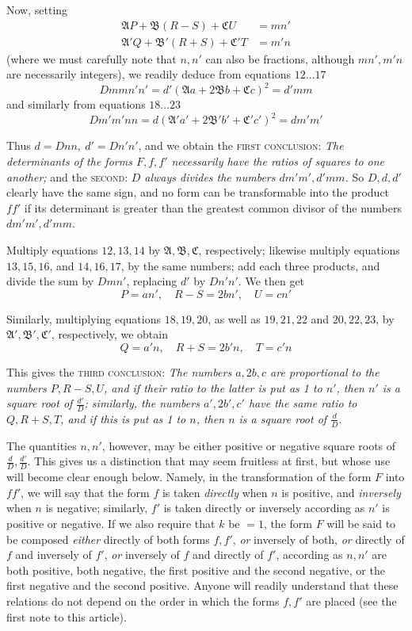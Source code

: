 Now, setting
\[
\begin{aligned}
\mathfrak{A}P+\mathfrak{B}(R-S)+\mathfrak{C}U&=mn'\\
\mathfrak{A}'Q+\mathfrak{B}'(R+S)+\mathfrak{C}'T&=m'n
\end{aligned}
\]
(where we must carefully note that $n,n'$ can also be fractions, although $mn',m'n$ are necessarily integers), we readily deduce from equations $12\ldots17$
\[
Dmmn'n'=d'(\mathfrak{A}a+2\mathfrak{B}b+\mathfrak{C}c)^2=d'mm
\]
and similarly from equations $18\ldots23$
\[
Dm'm'nn=d(\mathfrak{A}'a'+2\mathfrak{B}'b'+\mathfrak{C}'c')^2=dm'm'
\]

Thus $d=Dnn,\ d'=Dn'n'$, and we obtain the \textsc{first conclusion}: \textit{The determinants of the forms $F,f,f'$ necessarily have the ratios of squares to one another;} and the \textsc{second}: \textit{$D$ always divides the numbers $dm'm',d'mm$.} So $D,d,d'$ clearly have the same sign, and no form can be transformable into the product $ff'$ if its determinant is greater than the greatest common divisor of the numbers $dm'm',d'mm$.

Multiply equations $12,13,14$ by $\mathfrak{A},\mathfrak{B},\mathfrak{C}$, respectively; likewise multiply equations $13,15,16$, and $14,16,17$, by the same numbers; add each three products, and divide the sum by $Dmn'$, replacing $d'$ by $Dn'n'$. We then get
\[
P=an',\quad R-S=2bn',\quad U=cn'
\]

Similarly, multiplying equations $18,19,20$, as well as $19,21,22$ and $20,22,23$, by $\mathfrak{A}',\mathfrak{B}',\mathfrak{C}'$, respectively, we obtain
\[
Q=a'n,\quad R+S=2b'n,\quad T=c'n
\]

This gives the \textsc{third conclusion}: \textit{The numbers $a,2b,c$ are proportional to the numbers $P,R-S,U$, and if their ratio to the latter is put as 1 to $n'$, then $n'$ is a square root of $\frac{d'}{D}$; similarly, the numbers $a',2b',c'$ have the same ratio to $Q,R+S,T$, and if this is put as 1 to $n$, then $n$ is a square root of $\frac{d}{D}$.}

The quantities $n,n'$, however, may be either positive or negative square roots of $\frac{d}{D},\frac{d'}{D}$. This gives us a distinction that may seem fruitless at first, but whose use will become clear enough below. Namely, in the transformation of the form $F$ into $ff'$, we will say that the form $f$ is taken \textit{directly} when $n$ is positive, and \textit{inversely} when $n$ is negative; similarly, $f'$ is taken directly or inversely according as $n'$ is positive or negative. If we also require that $k$ be $=1$, the form $F$ will be said to be composed \textit{either} directly of both forms $f,f'$, \textit{or} inversely of both, \textit{or} directly of $f$ and inversely of $f'$, \textit{or} inversely of $f$ and directly of $f'$, according as $n,n'$ are both positive, both negative, the first positive and the second negative, or the first negative and the second positive. Anyone will readily understand that these relations do not depend on the order in which the forms $f,f'$ are placed (see the first note to this article).

